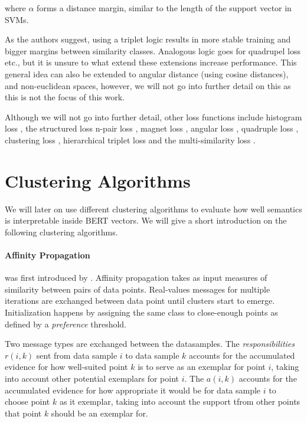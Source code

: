 \documentclass[a4paper,12pt,twoside,openright]{report}
\begin{document}
where $\alpha$ forms a distance margin, similar to the length of the support vector in SVMs.

As the authors suggest, using a triplet logic results in more stable training and bigger margins between similarity classes.
Analogous logic goes for quadrupel loss etc., but it is unsure to what extend these extensions increase performance.
This general idea can also be extended to angular distance (using cosine distances), and non-euclidean spaces, however, we will not go into further detail on this as this is not the focus of this work.

Although we will not go into further detail, other loss functions include histogram loss \cite{ustinova16}, the structured loss \cite{song16} n-pair loss \cite{sohn16}, magnet loss \cite{rippel16}, angular loss \cite{wang17}, quadruple loss \cite{ni17}, clustering loss \cite{song17}, hierarchical triplet loss \cite{ge18} and the multi-similarity loss \cite{wang19c}.


\section{Clustering Algorithms}

We will later on use different clustering algorithms to evaluate how well semantics is interpretable inside BERT vectors.
We will give a short introduction on the following clustering algorithms.

\paragraph{Affinity Propagation} was first introduced by \cite{frey07}.
Affinity propagation takes as input measures of similarity between pairs of data points. 
Real-values messages for multiple iterations are exchanged between data point until clusters start to emerge.
Initialization happens by assigning the same class to close-enough points as defined by a \textit{preference} threshold.

Two message types are exchanged between the datasamples.  
The \textit{responsibilities} $r(i, k)$ sent from data sample $i$ to data sample $k$ accounts for the accumulated evidence for how well-suited point $k$ is to serve as an exemplar for point $i$, taking into account other potential exemplars for point $i$.
The  $a(i, k)$ accounts for the accumulated evidence for how appropriate it would be for data sample $i$ to choose point $k$ as it exemplar, taking into account the support tfrom other points that point $k$ should be an exemplar for.
\end{document}
